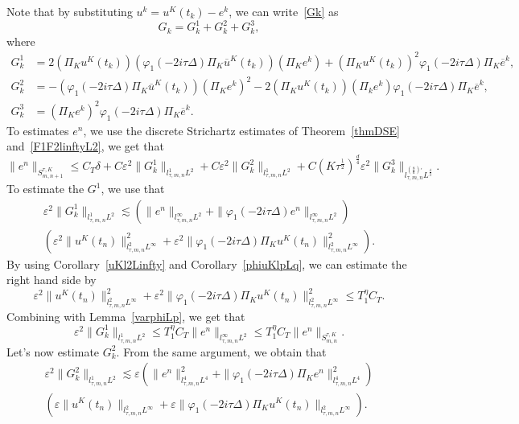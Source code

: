 \documentclass[10pt,a4paper]{article}
\begin{document}
  Note that by substituting \(u^k = u^K(t_k) - e^k \), we can write~\eqref{Gk}
  as 
  \[ G_k = G_k^1 + G_k^2 + G_k^3, \]
  where 
  \begin{equation*}
    \begin{aligned}
      G_k^1 &= 2(\Pi_K u^K(t_k))(\varphi_1(-2i\tau\Delta)\Pi_K\overline u^K(t_k))(\Pi_K e^k)
      + (\Pi_K u^K(t_k))^2\varphi_1(-2i\tau\Delta)\Pi_K\overline e^k, \\
      G_k^2 &= -\left(\varphi_1(-2i\tau\Delta)\Pi_K \overline u^K(t_k)\right)(\Pi_K e^k)^2 
      - 2(\Pi_K u^K(t_k))(\Pi_k e^k)\varphi_1(-2i\tau\Delta)\Pi_K \overline e^k, \\
      G_k^3 &= (\Pi_K e^k)^2\varphi_1(-2i\tau\Delta)\Pi_K\overline e^k.
    \end{aligned}
  \end{equation*}
  To estimates \(e^n\), we use the discrete Strichartz estimates of
  Theorem~\ref{thmDSE} and~\eqref{F1F2linftyL2}, we get that 
  \begin{equation}\label{enlinftyL2}
    \|e^n\|_{S^{\tau,K}_{m,n+1}} \leq C_T \delta + C \varepsilon^2\|G_k^1\|_{l^1_{\tau,m,n}L^2} 
    + C \varepsilon^2\|G_k^2\|_{l^1_{\tau,m,n}L^2} + C (K\tau^\frac12)^\frac d4 
    \varepsilon^2\|G_k^3\|_{l^{(\frac8d)'}_{\tau,m,n}L^\frac43} .
  \end{equation}
  To estimate the \(G^1\), we use that 
  \begin{multline*}
    \varepsilon^2\|G_k^1\|_{l^1_{\tau,m,n}L^2} \lesssim \left(\|e^n\|_{l^\infty_{\tau,m,n}L^2}
    + \|\varphi_1(-2i\tau\Delta)e^n\|_{l^\infty_{\tau,m,n}L^2} \right) \\ \left( 
    \varepsilon^2 \|u^K(t_n)\|_{l^2_{\tau,m,n}L^\infty}^2 + 
    \varepsilon^2 \|\varphi_1(-2i\tau\Delta)\Pi_K u^K(t_n)\|_{l^2_{\tau,m,n}L^\infty}^2 \right).
  \end{multline*}
  By using Corollary~\ref{uKl2Linfty} and Corollary~\ref{phiuKlpLq}, we can estimate the right
  hand side by 
  \[ \varepsilon^2 \|u^K(t_n)\|_{l^2_{\tau,m,n}L^\infty}^2 + \varepsilon^2 
  \|\varphi_1(-2i\tau\Delta)\Pi_K u^K(t_n)\|_{l^2_{\tau,m,n}L^\infty}^2 \leq T_1^\eta C_T. \] 
  Combining with Lemma~\ref{varphiLp}, we get that
  \begin{equation}\label{G1}
    \varepsilon^2\|G_k^1\|_{l^1_{\tau,m,n}L^2} \leq T_1^\eta C_T \|e^n\|_{l^\infty_{\tau,m,n}L^2}
    \leq T_1^\eta C_T \|e^n\|_{S^{\tau,K}_{m,n}}.
  \end{equation}
  Let's now estimate \(G_k^2\). From the same argument, we obtain that 
  \begin{multline*}
    \varepsilon^2\|G_k^2\|_{l^1_{\tau,m,n}L^2} \lesssim  \varepsilon
    \left(\|e^n\|^2_{l^4_{\tau,m,n}L^4} + \|\varphi_1(-2i\tau\Delta)\Pi_K e^n\|^2_{l^4_{\tau,m,n}L^4} \right) \\
    \left( \varepsilon \|u^K(t_n)\|_{l^2_{\tau,m,n}L^\infty} + 
    \varepsilon \|\varphi_1(-2i\tau\Delta)\Pi_K u^K(t_n)\|_{l^2_{\tau,m,n}L^\infty} \right).
  \end{multline*}
\end{document}
